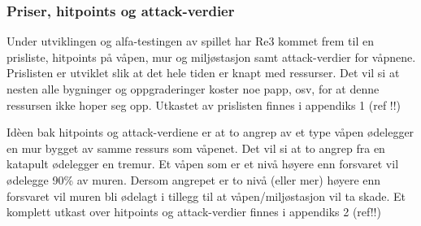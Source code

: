 \subsubsection{Priser, hitpoints og attack-verdier}
Under utviklingen og alfa-testingen av spillet har Re3 kommet frem til en prisliste, hitpoints på våpen, mur og miljøstasjon samt attack-verdier for våpnene.\\

Prislisten er utviklet slik at det hele tiden er knapt med ressurser. Det vil si at nesten alle bygninger og oppgraderinger koster noe papp, osv, for at denne ressursen ikke hoper seg opp. Utkastet av prislisten finnes i appendiks 1 (ref !!)

Idèen bak hitpoints og attack-verdiene er at to angrep av et type våpen ødelegger en mur bygget av samme ressurs som våpenet. Det vil si at to angrep fra en katapult ødelegger en tremur. Et våpen som er et nivå høyere enn forsvaret vil ødelegge 90\% av muren. Dersom angrepet er to nivå (eller mer) høyere enn forsvaret vil muren bli ødelagt i tillegg til at våpen/miljøstasjon vil ta skade. Et komplett utkast over hitpoints og attack-verdier finnes i appendiks 2 (ref!!)